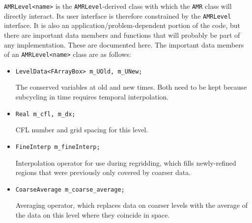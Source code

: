 {\tt AMRLevel<name>} is the {\tt AMRLevel}-derived class with 
which the {\tt AMR} class will directly interact.  Its user
interface is therefore constrained by the {\tt AMRLevel} 
interface.  It is also an application/problem-dependent portion of
the code, but there are important data members and functions that will
probably be part of any implementation.  These are documented here.
The important data members of an {\tt AMRLevel<name>}
class are as follows:
\begin{itemize}
\item \begin{small} \begin{verbatim}
LevelData<FArrayBox> m_UOld, m_UNew;
\end{verbatim}\end{small}
The conserved variables at old and new times.  Both need to be kept
because subcycling in time requires temporal interpolation.

\item \begin{small} \begin{verbatim}
Real m_cfl, m_dx;
\end{verbatim}\end{small}
CFL number and grid spacing for this level.

\item \begin{small} \begin{verbatim}
FineInterp m_fineInterp;
\end{verbatim}\end{small}
Interpolation operator for use during regridding, which fills
newly-refined regions that were previously only covered by coarser
data.  

\item \begin{small} \begin{verbatim}
CoarseAverage m_coarse_average;
\end{verbatim}\end{small}
Averaging operator, which replaces data on coarser levels with
the average of the data on this level where they coincide in space.
\end{itemize}

